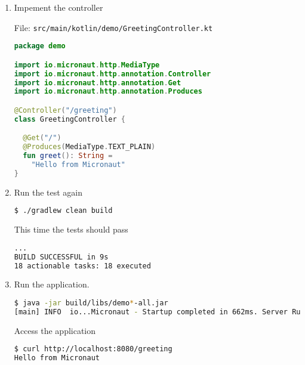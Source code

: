 \begin{enumerate}
\item Impement the controller

File: \texttt{src/main/kotlin/demo/GreetingController.kt}

\begin{lstlisting}[language=Kotlin]
package demo

import io.micronaut.http.MediaType
import io.micronaut.http.annotation.Controller
import io.micronaut.http.annotation.Get
import io.micronaut.http.annotation.Produces

@Controller("/greeting")
class GreetingController {

  @Get("/")
  @Produces(MediaType.TEXT_PLAIN)
  fun greet(): String =
    "Hello from Micronaut"
}
\end{lstlisting}

\item Run the test again

\begin{lstlisting}[language=bash]
$ ./gradlew clean build
\end{lstlisting}

This time the tests should pass

\begin{lstlisting}[language=bash]
...
BUILD SUCCESSFUL in 9s
18 actionable tasks: 18 executed
\end{lstlisting}

\item Run the application.

\begin{lstlisting}[language=bash]
$ java -jar build/libs/demo*-all.jar
[main] INFO  io...Micronaut - Startup completed in 662ms. Server Running: http://localhost:8080
\end{lstlisting}

Access the application

\begin{lstlisting}[language=bash]
$ curl http://localhost:8080/greeting
Hello from Micronaut
\end{lstlisting}

\end{enumerate}

